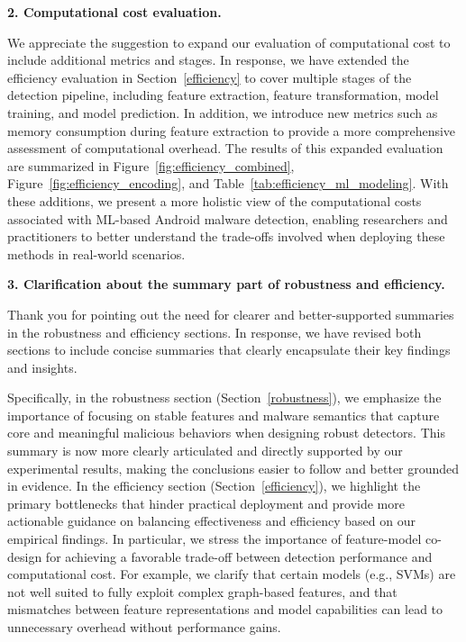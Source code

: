 \vspace{0.1cm}
\noindent \textbf{2. Computational cost evaluation.}

We appreciate the suggestion to expand our evaluation of computational cost to include additional metrics and stages. In response, we have extended the efficiency evaluation in Section~\ref{efficiency} to cover multiple stages of the detection pipeline, including feature extraction, feature transformation, model training, and model prediction. In addition, we introduce new metrics such as memory consumption during feature extraction to provide a more comprehensive assessment of computational overhead.
The results of this expanded evaluation are summarized in Figure~\ref{fig:efficiency_combined}, Figure~\ref{fig:efficiency_encoding}, and Table~\ref{tab:efficiency_ml_modeling}. With these additions, we present a more holistic view of the computational costs associated with ML-based Android malware detection, enabling researchers and practitioners to better understand the trade-offs involved when deploying these methods in real-world scenarios.

\vspace{0.1cm}
\noindent \textbf{3. Clarification about the summary part of robustness and efficiency.}

Thank you for pointing out the need for clearer and better-supported summaries in the robustness and efficiency sections. In response, we have revised both sections to include concise summaries that clearly encapsulate their key findings and insights.

Specifically, in the robustness section (Section~\ref{robustness}), we emphasize the importance of focusing on stable features and malware semantics that capture core and meaningful malicious behaviors when designing robust detectors. This summary is now more clearly articulated and directly supported by our experimental results, making the conclusions easier to follow and better grounded in evidence.
In the efficiency section (Section~\ref{efficiency}), we highlight the primary bottlenecks that hinder practical deployment and provide more actionable guidance on balancing effectiveness and efficiency based on our empirical findings. In particular, we stress the importance of feature-model co-design for achieving a favorable trade-off between detection performance and computational cost. For example, we clarify that certain models (e.g., SVMs) are not well suited to fully exploit complex graph-based features, and that mismatches between feature representations and model capabilities can lead to unnecessary overhead without performance gains.

